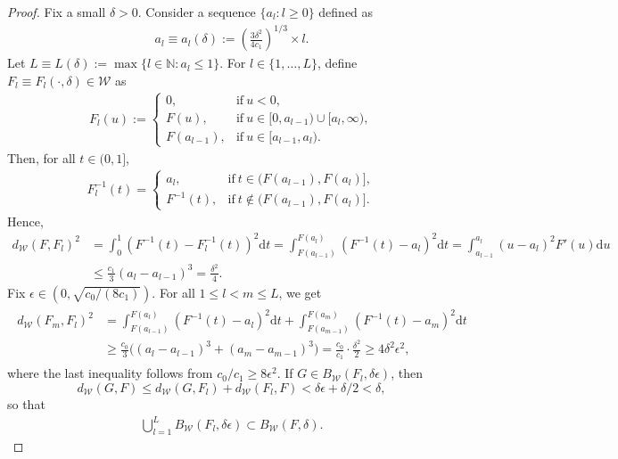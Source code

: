 \documentclass[11pt]{article}
\numberwithin{equation}{section}
\begin{document}
\begin{proof}
    Fix a small $\delta > 0$. Consider a sequence $\{a_l: l \ge 0\}$ defined as
    \begin{align*}
        a_l \equiv a_l(\delta):= \left( \frac{3\delta^2}{4c_1} \right)^{1/3} \times l.
    \end{align*}
    Let $L \equiv L(\delta):= \max \{l \in \mathbb{N} : a_l \leq 1 \}$. For $l \in \{1, \ldots, L\}$, define $F_l \equiv F_l(\cdot,\delta)\in \mathcal{W}$ as
    \begin{align*}
        F_l (u) :=
        \begin{cases}
            0, & \text{if}~u < 0, \\
            F(u), & \text{if}~u\in[0,a_{l-1})\cup[a_l,\infty),\\
            F(a_{l-1}), & \text{if}~u \in [a_{l-1}, a_l). %
        \end{cases}
    \end{align*}
    Then, for all $t\in(0,1]$,
    \begin{align*}
        F_l^{-1} (t) =
        \begin{cases}
            a_{l}, & \text{if}~t \in (F(a_{l-1}), F(a_l)], \\
            F^{-1}(t), & \text{if}~t \notin (F(a_{l-1}), F(a_l)].
        \end{cases}
    \end{align*}
    Hence,
    \begin{align*}
        d_{\mathcal{W}} \left(F, F_l \right)^2 & = \int_0^1 (F^{-1}(t)- F_l^{-1}(t))^2 \mathrm{d}t
        = \int_{F(a_{l-1})}^{F(a_l)} \left(F^{-1}(t) - a_l \right)^2 \mathrm{d}t = \int_{a_{l-1}}^{a_l} \left(u - a_l \right)^2 F'(u) \mathrm{d}u \\
        &\le \frac{c_1}{3} (a_{l} - a_{l-1})^3
        = \frac{\delta^2}{4}.
    \end{align*}
    Fix $\epsilon \in (0, \sqrt{c_0/(8c_1)})$. For all $1 \le l<m\le L$, we get
    \begin{align}\label{dist-Fmn}\begin{split}
        d_{\mathcal{W}} \left( F_m,  F_l \right)^2
        & = \int_{F(a_{l-1})}^{F(a_l)} \left( F^{-1}(t) - a_l \right)^2 \mathrm{d}t + \int_{F(a_{m-1})}^{F(a_m)} \left( F^{-1}(t) - a_m \right)^2 \mathrm{d}t \\
        & \geq \frac{c_0}{3}\big((a_{l} - a_{l-1})^3 + (a_{m} - a_{m-1})^3\big)
        = \frac{c_0}{c_1} \cdot \frac{\delta^2}{2} \geq 4 \delta^2 \epsilon^2,
        \end{split}
    \end{align}
    where the last inequality follows from $c_0/c_1 \ge 8 \epsilon^2$.
    If $G \in B_{\mathcal{W}}(F_l, \delta \epsilon)$, then
    $$d_{\mathcal{W}} \left(G,F \right) \leq d_{\mathcal{W}} \left( G,F_l \right) + d_{\mathcal{W}} \left(F_l,F \right) < \delta \epsilon + \delta / 2 < \delta,$$
    so that
    \begin{align}\label{covering1}
        \bigcup_{l=1}^L B_{\mathcal{W}}(F_l, \delta \epsilon) \subset B_{\mathcal{W}}(F, \delta).
    \end{align}


\end{proof}
\end{document}
